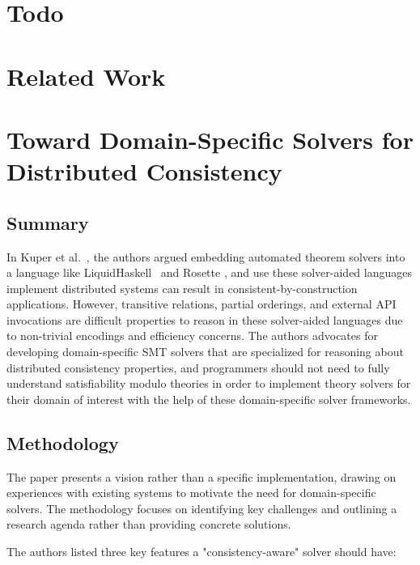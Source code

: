 \section{Todo}

\section{Related Work}


{\color{red}

  \section{Toward Domain-Specific Solvers for Distributed Consistency}

  \subsection{Summary}

  In Kuper et al.~\cite{kuper2019toward}, the authors argued
  embedding automated theorem
  solvers into a language like
  LiquidHaskell~\cite{vazou2014liquidhaskell} and Rosette
  \cite{torlak2014a}, and use these solver-aided languages implement
  distributed systems
  can result in consistent-by-construction applications. However, transitive
  relations, partial orderings, and external API invocations are difficult
  properties to reason in these solver-aided languages due to non-trivial
  encodings and efficiency concerns. The authors advocates for developing
  domain-specific SMT solvers that are specialized for reasoning
  about distributed
  consistency properties, and programmers should not need to fully understand
  satisfiability modulo theories in order to implement theory solvers for their
  domain of interest with the help of these domain-specific solver frameworks.

  \subsection{Methodology}

  The paper presents a vision rather than a specific implementation, drawing on
  experiences with existing systems to motivate the need for domain-specific
  solvers. The methodology focuses on identifying key challenges and outlining a
  research agenda rather than providing concrete solutions.

  The authors listed three key features a "consistency-aware" solver
  should have:

}
